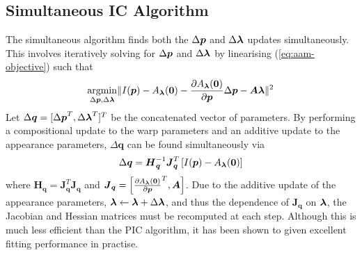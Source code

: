 \subsection{Simultaneous IC Algorithm}\label{subsec:aam-simultaneous}
The simultaneous algorithm \cite{RefWorks:278} finds both the $\Delta \boldsymbol{p}$ and $\Delta \boldsymbol{\lambda}$ updates simultaneously. This involves iteratively solving for $\Delta \boldsymbol{p}$ and $\Delta \boldsymbol{\lambda}$ by linearising (\ref{eq:aam-objective}) such that
\begin{equation}\label{eq:aam-simultaneous-linearise}
    \argmin_{\Delta \p, \Delta \blambda} \norm{I(\p) - A_{\blambda}(\zero) - \frac{\partial A_{\blambda}(\zero)}{\partial \p} \Delta \p - \boldsymbol{A} \blambda}^2
\end{equation}
Let $\Delta \boldsymbol{q} = [{\Delta \boldsymbol{p}}^T, {\Delta \boldsymbol{\lambda}}^T]^T$ be the concatenated vector of parameters. By performing a compositional update to the warp parameters and an additive update to the appearance parameters, $\Delta \boldsymbol{q}$ can be found simultaneously via
\begin{equation}\label{eq:aam-simultaneous-deltaq-update}
    \Delta \boldsymbol{q} = \boldsymbol{H}_{\boldsymbol{q}}^{-1} \boldsymbol{J}_{\boldsymbol{q}}^{T} \left[ I(\p) - A_{\blambda}(\zero) \right]
\end{equation}
where $\boldsymbol{H}_{\boldsymbol{q}} = \boldsymbol{J}_{\boldsymbol{q}}^{T} \boldsymbol{J}_{\boldsymbol{q}}$ and $\boldsymbol{J}_{\boldsymbol{q}} = \left[ {\frac{\partial A_{\boldsymbol{\lambda}}(\boldsymbol{0})}{\partial \boldsymbol{p}}}^T, \boldsymbol{A} \right]$. Due to the additive update of the appearance parameters, $\boldsymbol{\lambda} \leftarrow \boldsymbol{\lambda} + \Delta \boldsymbol{\lambda}$, and thus the dependence of $\boldsymbol{J}_{\boldsymbol{q}}$ on $\boldsymbol{\lambda}$, the Jacobian and Hessian matrices must be recomputed at each step. Although this is much less efficient than the PIC algorithm, it has been shown to given excellent fitting performance in practise.
